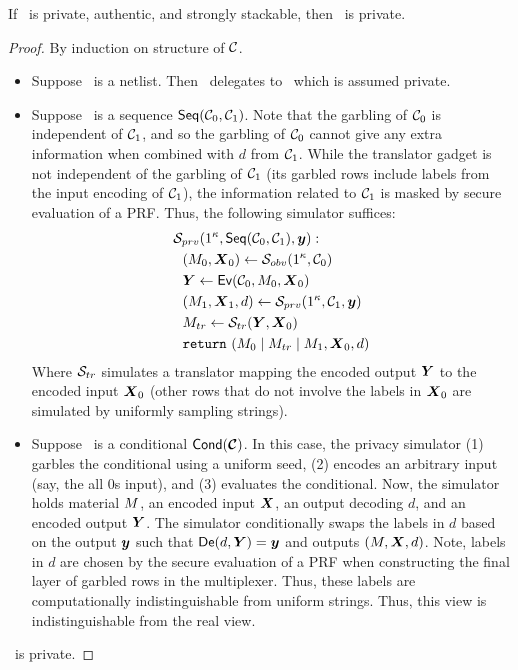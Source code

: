 \begin{theorem}
  If \underscheme\ is private, authentic, and strongly stackable, then \ourscheme\ is private.
\end{theorem}
\begin{proof}
  By induction on structure of $\mathcal C$.
  \begin{itemize}
    \item Suppose \cir\ is a netlist. Then \ourscheme\ delegates to
      \underscheme\ which is assumed private.
    \item Suppose \cir\ is a sequence $\textsf{Seq}(\mathcal C_0, \mathcal C_1)$.
      Note that the garbling of $\mathcal C_0$ is independent of
      $\mathcal C_1$, and so the garbling of $\mathcal C_0$ cannot give any extra information when combined
      with $d$ from $\mathcal C_1$.
      While the translator gadget is not independent of the garbling
      of $\mathcal C_1$ (its garbled rows include labels from the input
      encoding of $\mathcal C_1$), the information related to $\mathcal C_1$ is
      masked by secure evaluation of a PRF.
      Thus, the following simulator suffices:
      \begin{align*}
        &\simulator_{prv}(1^\kappa, \sequential(\cir_0, \cir_1), \cirout):\\
        &~~(\mat_0, \gcirinp_0) \gets \simulator_{obv}(1^\kappa, \cir_0)\\
        &~~\gcirout \gets \gEv(\cir_0, \mat_0, \gcirinp_0)\\
        &~~(\mat_1, \gcirinp_1, d) \gets \simulator_{prv}(1^\kappa, \cir_1, \cirout)\\
        &~~\mat_{tr} \gets \simulator_{tr}(\gcirout, \gcirinp_0)\\
        &~~\creturn~(\mat_0 \mid \mat_{tr} \mid \mat_1, \gcirinp_0, d)
      \end{align*}
      Where $\mathcal{S}_{tr}$ simulates a translator
      mapping the encoded output $\gcirout$ to the encoded input
      $\gcirinp_0$ (other rows that do not involve the labels in
      $\gcirinp_0$ are simulated by uniformly sampling strings).
    \item Suppose \cir\ is a conditional $\conditional(\vec \cir)$.
      In this case, the privacy simulator (1) garbles the conditional
      using a uniform seed, (2) encodes an arbitrary input (say, the
      all 0s input), and (3) evaluates the conditional.
      Now, the simulator holds material $M$, an encoded input
      $\gcirinp$, an output decoding $d$, and an encoded output
      $\gcirout$.
      The simulator conditionally swaps the labels in $d$ based on the
      output $\cirout$ such that $\gDe(d, \gcirout) = \cirout$ and
      outputs $(\mat, \gcirinp, d)$.
      Note, labels in $d$ are chosen by the secure evaluation of a PRF
      when constructing the final layer of garbled rows in the multiplexer.
      Thus, these labels are computationally indistinguishable from
      uniform strings.
      Thus, this view is indistinguishable from the real view.
  \end{itemize}
  \ourscheme\ is private.
\end{proof}

